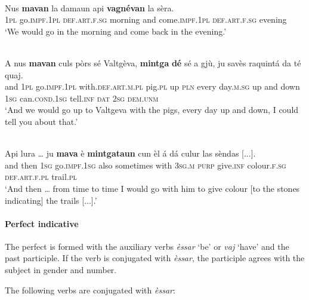 \ea\label{ex:impf:3}
\\
\gll    Nus \textbf{mavan} la damaun api \textbf{vagnévan} la sèra. \\
\textsc{1pl} go.\textsc{impf.1pl}  \textsc{def.art.f.sg} morning and come.\textsc{impf.1pl} \textsc{def.art.f.sg} evening \\
\glt `We would go in the morning and come back in the evening.'
\z

\ea\label{ex:impf:4}
\\
\gll    A nus \textbf{mavan} culs pòrs sé Valtgèva, \textbf{mintga} \textbf{dé} sé a gjù, ju savès raquintá da té quaj.\\
and \textsc{1pl}  go.\textsc{impf.1pl} with.\textsc{def.art.m.pl} pig.\textsc{pl} up \textsc{pln} every day.\textsc{m.sg} up and down  \textsc{1sg}  can.\textsc{cond.1sg}  tell.\textsc{inf}  \textsc{dat}  \textsc{2sg} \textsc{dem.unm}\\
\glt `And we would go up to Valtgeva with the pigs, every day up and down, I could tell you about that.'
\z

\ea\label{ex:impf:5}
\\
\gll  Api lura … ju \textbf{mava} è \textbf{mintgataun} cun èl á dá culur las sèndas [...].\\
and then {} \textsc{1sg} go.\textsc{impf.1sg} also sometimes with \textsc{3sg.m} \textsc{purp} give.\textsc{inf} colour.\textsc{f.sg} \textsc{def.art.f.pl} trail.\textsc{pl}\\
\glt `And then … from time to time I would go with him to give colour [to the stones indicating] the trails [...].'
\z


\paragraph{Perfect indicative}
The perfect is formed with the auxiliary verbs \textit{èssar} `be' or \textit{vaj} `have' and the past participle. If the verb is conjugated with \textit{èssar}, the participle agrees with the subject in gender and number.

The following verbs are conjugated with \textit{èssar}:

